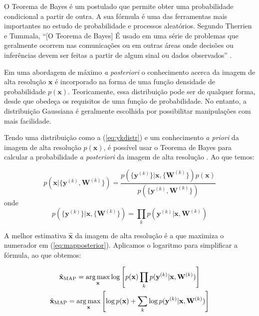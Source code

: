O Teorema de Bayes é um postulado que permite obter uma probabilidade condicional a
partir de outra.
A sua fórmula é uma das ferramentas mais importantes no estudo de probabilidade e
processos aleatórios.
Segundo Therrien e Tummala, “[O Teorema de Bayes] É usado em uma série de problemas que
geralmente ocorrem nas comunicações ou em outras áreas onde decisões ou inferências
devem ser feitas a partir de algum sinal ou dados observados” \cite{therrien2011probability}.

Em uma abordagem de máximo \emph{a posteriori} o conhecimento acerca da imagem de alta resolução $\mathbf{x}$ é incorporado na forma de uma função densidade de probabilidade $p(\mathbf{x})$.
Teoricamente, essa distribuição pode ser de qualquer forma, desde que obedeça os requisitos de uma função de probabilidade.
No entanto, a distribuição Gaussiana é geralmente escolhida por possibilitar manipulações com mais facilidade.


Tendo uma distribuição como a (\ref{eq:ykdistr}) e um conhecimento \emph{a priori} da imagem de alta resolução $p(\mathbf{x})$, é possível usar o Teorema de Bayes para calcular a probabilidade \emph{a posteriori} da imagem de alta resolução \cite{nasrollahi2014super,pickup2007bayesian,pickup2007bayesian2} . Ao que temos:

\begin{equation}
	\label{eq:mapposterior}
	p(\mathbf{x} | \{\mathbf{y}^{(k)}, \mathbf{W}^{(k)}\}) = \frac{p(\{\mathbf{y}^{(k)}\} | \mathbf{x}, \{\mathbf{W}^{(k)}\}) p(\mathbf{x})}
	{p(\{\mathbf{y}^{(k)}, \mathbf{W}^{(k)}\})}
\end{equation}
onde
\begin{equation}
	p(\{\mathbf{y}^{(k)}\} | \mathbf{x}, \{\mathbf{W}^{(k)}\}) = 
	\prod_k p(\mathbf{y}^{(k)} | \mathbf{x}, \mathbf{W}^{(k)})
\end{equation}

A melhor estimativa $\hat{\mathbf{x}}$ da imagem de alta resolução é a que maximiza o numerador em (\ref{eq:mapposterior}).
Aplicamos o logaritmo para simplificar a fórmula, ao que obtemos:

\begin{gather}
	\hat{\mathbf{x}}_{\mathrm{MAP}} = \operatorname*{arg\,max}_{\mathbf{x}} \log \left[ p(\mathbf{x}) \prod_k p(\mathbf{y}^{(k)} | \mathbf{x}, \mathbf{W}^{(k)}) \right] \\
	\hat{\mathbf{x}}_{\mathrm{MAP}} = \operatorname*{arg\,max}_{\mathbf{x}} \left[ \log p(\mathbf{x}) + \sum_k \log p(\mathbf{y}^{(k)} | \mathbf{x}, \mathbf{W}^{(k)}) \right]
\end{gather}
